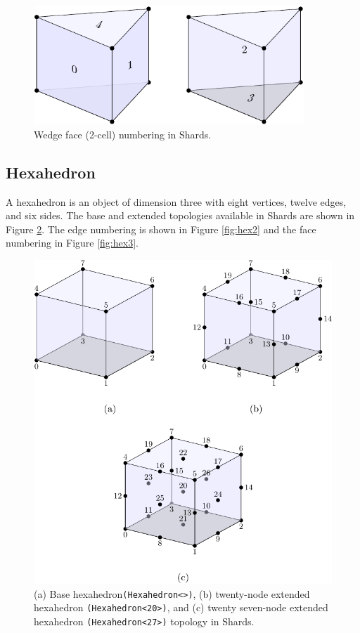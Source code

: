 \documentclass[pdf,12pt,relaxed]{SANDreport}
\begin{document}
\begin{figure}[ht]
  \begin{center}
    \includegraphics[width=4.0in]{topo_figs/wedge_face.pdf}
 \end{center}
  \caption{Wedge face (2-cell) numbering in Shards.}
 \label{fig:wed3}
\end{figure}


\subsection{Hexahedron}
A hexahedron is an object of dimension three with eight vertices, twelve edges, and six sides. The base and extended topologies available in Shards are shown in Figure \ref{fig:hex1}. The edge numbering is shown in Figure \ref{fig:hex2} and the face numbering in Figure \ref{fig:hex3}.

\begin{figure}[ht]
  \begin{center}
    \includegraphics[width=4.5in]{topo_figs/hex_node.pdf}
  \end{center}
 \caption{(a) Base hexahedron{\tt (Hexahedron<>)}, (b) twenty-node extended hexahedron {\tt (Hexahedron<20>)}, and (c) twenty seven-node extended hexahedron {\tt (Hexahedron<27>)} topology in Shards.}
 \label{fig:hex1}
\end{figure}
\end{document}
